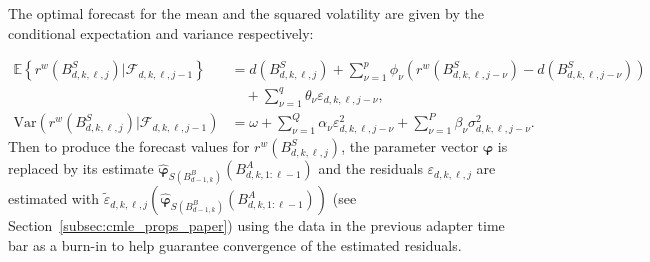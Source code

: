 \documentclass[10pt,a4paper,oneside]{article}
\newcommand{\E}{\mathbb{E}}
\newcommand{\SigAl}{\mathcal{F}}
\begin{document}
The optimal forecast for the mean and the squared volatility are given by the conditional expectation and variance respectively:

\begin{align*}
    \E \left \{ r^w(B^{S}_{d,k,\ell,j}) \big| \SigAl_{d, k, \ell, j - 1} \right \}                   & =d\left( B^S_{d,k,\ell,j} \right) + \sum^p_{\nu = 1} \phi_{\nu} \left( r^w(B^{S}_{d,k,\ell,j- \nu}) - d\left( B^S_{d,k,\ell,j - \nu} \right) \right) \\
                                                                                                     & \quad+ \sum^q_{\nu = 1} \theta_{\nu} \varepsilon_{d, k, \ell, j - \nu},                                                                              \\
    \mathrm{Var}\left(r^w\left( B^S_{d, k, \ell, j}\right) \bigg| \SigAl_{d, k, \ell, j - 1} \right) & = \omega + \sum^{Q}_{\nu = 1} \alpha_{\nu} \varepsilon^2_{d,k,\ell,j - \nu} + \sum^P_{\nu = 1} \beta_{\nu} \sigma_{d, k, \ell, j - \nu}^2.
\end{align*}
Then to produce the forecast values for $r^w(B^{S}_{d,k,\ell,j})$, the parameter vector $\boldsymbol{\varphi}$ is replaced by its estimate $\hat{\boldsymbol{\varphi}}_{S\left(B^B_{d - 1, k}\right)}\left( B^A_{d,k,1:\ell - 1} \right)$ and the residuals $\varepsilon_{d,k,\ell,j}$ are estimated with $\tilde{\varepsilon}_{d,k,\ell,j} \left( \hat{\boldsymbol{\varphi}}_{S\left(B^B_{d - 1, k}\right)}\left( B^A_{d,k,1:\ell - 1} \right) \right)$ (see Section~\ref{subsec:cmle_props_paper}) using the data in the previous adapter time bar as a burn-in to help guarantee convergence of the estimated residuals.


\end{document}
